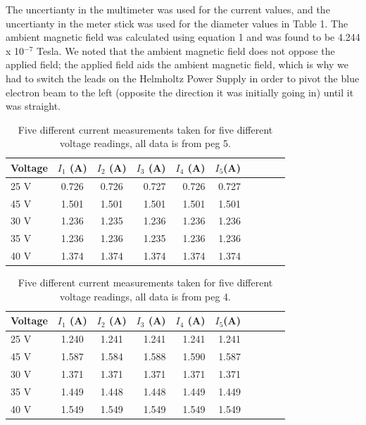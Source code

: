 \documentclass[twoside,10pt]{article}
\begin{document}
\begin{multicols}{2}
		The uncertianty in the multimeter was used for the current values, and the uncertianty in the meter stick was used for the diameter values in Table 1. The ambient magnetic field was calculated using equation 1 and was found to be 4.244 x 10$^{-7}$ Tesla. We noted that the ambient magnetic field does not oppose the applied field; the applied field aids the ambient magnetic field, which is why we had to switch the leads on the Helmholtz Power Supply in order to pivot the blue electron beam to the left (opposite the direction it was initially going in) until it was straight.  
		
		\begin{table}[H]
			\centering
			\small
			\caption{Five different current measurements taken for five different voltage readings, all data is from peg 5.}
			\begin{tabular}{l c c rrrrrrr}
				\toprule				
			Voltage &  $I_1$ (A) & $I_2$ (A) & $I_3$ (A) & $I_4$ (A) & $I_5$(A) \\ [1ex]
				\midrule
				25 V	 & 0.726 & 0.726 & 0.727 & 0.726 & 0.727 \\ [1.5ex]
				45 V	& 1.501 & 1.501 & 1.501 & 1.501 & 1.501  \\ [1.5ex]
				30 V	& 1.236 & 1.235 & 1.236 & 1.236 & 1.236  \\ [1.5ex]
				35 V	& 1.236 & 1.236 & 1.235 & 1.236 & 1.236 \\ [1.5ex]
				40 V	& 1.374 & 1.374 & 1.374 & 1.374 & 1.374 \\ [1.5ex]
				\bottomrule
			\end{tabular}
		\end{table}
		
			\begin{table}[H]
			\centering
			\small
			\caption{Five different current measurements taken for five different voltage readings, all data is from peg 4.}
			\begin{tabular}{l c c rrrrrrr}
				\toprule				
				Voltage &  $I_1$ (A) & $I_2$ (A) & $I_3$ (A) & $I_4$ (A) & $I_5$(A) \\ [1ex]
				\midrule
				25 V	 & 1.240 & 1.241 & 1.241 & 1.241 & 1.241 \\ [1.5ex]
				45 V	& 1.587 & 1.584 & 1.588 & 1.590 & 1.587  \\ [1.5ex]
				30 V	& 1.371 & 1.371 & 1.371 & 1.371 & 1.371  \\ [1.5ex]
				35 V	& 1.449 & 1.448 & 1.448 & 1.449 & 1.449 \\ [1.5ex]
				40 V	& 1.549 & 1.549 & 1.549 & 1.549 & 1.549 \\ [1.5ex]
				\bottomrule
			\end{tabular}
		\end{table}
	

\end{multicols}
\end{document}
